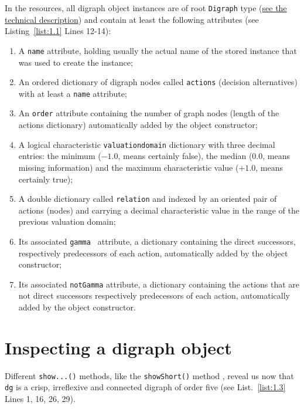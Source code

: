 In the \Digraph resources, all digraph object instances are of root \texttt{Digraph} type (\href{https://digraph3.readthedocs.io/en/latest/techDoc.html#organisation-of-the-digraph3-modules}{see the technical description}) and contain at least the following attributes (see Listing~\vref{list:1.1}  Lines 12-14):
\begin{enumerate}[leftmargin=0.5cm,listparindent=0em,nosep]
\item A \texttt{name} attribute, holding usually the actual name of the stored instance that was used to create the instance;
\item An ordered dictionary of digraph nodes called \texttt{actions} (decision alternatives) with at least a \texttt{name} attribute;
\item An \texttt{order} attribute containing the number of graph nodes (length of the actions dictionary) automatically added by the object constructor;
\item  A logical characteristic \texttt{valuationdomain} dictionary with three decimal entries: the minimum ($-1.0$, means certainly false), the median ($0.0$, means missing information) and the maximum characteristic value ($+1.0$, means certainly true);
\item A double dictionary called \texttt{relation} and indexed by an oriented pair of actions (nodes) and carrying a decimal characteristic value in the range of the previous valuation domain;
\item Its associated \texttt{gamma } attribute, a dictionary containing the direct successors, respectively predecessors of each action, automatically added by the object constructor;
\item Its associated \texttt{notGamma} attribute, a dictionary containing the actions that are not direct successors respectively predecessors of each action, automatically added by the object constructor.
\end{enumerate}

\section{Inspecting a digraph object}
\label{sec:1.4}

Different \texttt{show...()} methods, like the \texttt{showShort()} method , reveal us now that \texttt{dg} is a crisp, irreflexive and connected digraph of order five (see List.~\vref{list:1.3}  Lines 1, 16, 26, 29).

